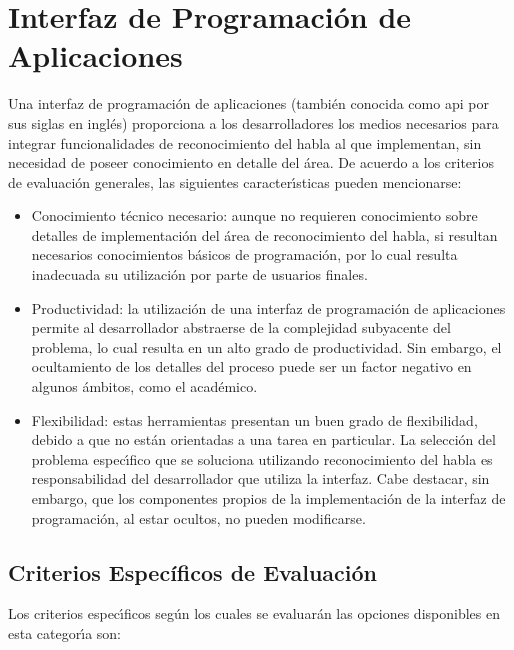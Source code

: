 \section{Interfaz de Programaci\'on de Aplicaciones}
\label{apis}


Una interfaz de programaci\'on de aplicaciones (tambi\'en conocida como \gls{api} por sus siglas en ingl\'es)
proporciona a los desarrolladores los medios necesarios para integrar funcionalidades de
reconocimiento del habla al  que implementan, sin necesidad de poseer
conocimiento en detalle del \'area. De acuerdo a los criterios de evaluaci\'on generales, las
siguientes caracter{\'\i}sticas pueden mencionarse:

\begin{itemize}
 	\item Conocimiento t\'ecnico necesario: aunque no requieren conocimiento sobre detalles de implementaci\'on
 	del \'area de reconocimiento del habla, si resultan necesarios conocimientos b\'asicos de
 	programaci\'on, por lo cual resulta inadecuada su utilizaci\'on por parte de usuarios finales.
 	\item Productividad: la utilizaci\'on de una interfaz de programaci\'on de aplicaciones permite
 	al desarrollador abstraerse de la complejidad subyacente del problema, lo cual resulta en
 	un alto grado de productividad. Sin embargo, el ocultamiento de los detalles del proceso
 	puede ser un factor negativo en algunos \'ambitos, como el acad\'emico.
 	\item Flexibilidad: estas herramientas presentan un buen grado de flexibilidad, debido a
 	que no est\'an orientadas a una tarea en particular. La selecci\'on del problema espec{\'\i}fico
 	que se soluciona utilizando reconocimiento del habla es responsabilidad del desarrollador
 	que utiliza la interfaz. Cabe destacar, sin embargo, que los componentes propios de la
 	implementaci\'on de la interfaz de programaci\'on, al estar ocultos, no
 	pueden modificarse.
 \end{itemize}


\subsection{Criterios Espec\'ificos de Evaluaci\'on}

Los criterios espec{\'\i}ficos seg\'un los cuales se evaluar\'an las opciones disponibles en esta
categor{\'\i}a son:

